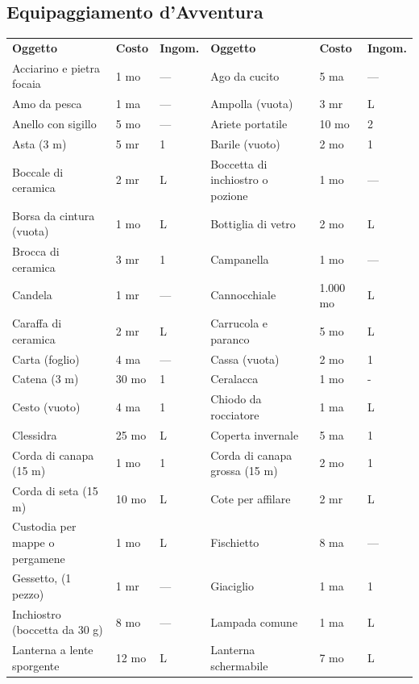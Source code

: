 \documentclass[a4paper,11pt,twoside,openany]{book}
\begin{document}
\subsection{Equipaggiamento d'Avventura}\label{Equipaggiamento}

\label{equipaggiamento-davventura}


\begin{tabularx}{1\textwidth}{XllXll}
	\textbf{Oggetto}    & \textbf{Costo} & \textbf{Ingom.} & \textbf{Oggetto}    & \textbf{Costo}  & \textbf{Ingom.} \\
	Acciarino e pietra focaia   & 1 mo& —   & Ago da cucito & 5 ma& —   \\
	Amo da pesca  & 1 ma& —   & Ampolla (vuota)& 3 mr& L   \\
	Anello con sigillo  & 5 mo& —   & Ariete portatile    & 10 mo& 2   \\
	Asta (3 m)    & 5 mr& 1   & Barile (vuoto)& 2 mo& 1   \\
	Boccale di ceramica & 2 mr& L   & Boccetta di inchiostro o pozione  & 1 mo& —   \\
	Borsa da cintura (vuota)    & 1 mo& L   & Bottiglia di vetro  & 2 mo& L   \\
	Brocca di ceramica  & 3 mr& 1   & Campanella    & 1 mo& —   \\
	Candela & 1 mr& —   & Cannocchiale  & 1.000 mo  & L   \\
	Caraffa di ceramica & 2 mr& L   & Carrucola e paranco & 5 mo& L   \\
	Carta (foglio)& 4 ma& —   & Cassa (vuota) & 2 mo& 1   \\
	Catena (3 m)  & 30 mo    & 1   & Ceralacca& 1 mo& -   \\
	Cesto (vuoto) & 4 ma& 1   & Chiodo da rocciatore& 1 ma& L   \\
	Clessidra& 25 mo    & L   & Coperta invernale   & 5 ma& 1   \\
	Corda di canapa (15 m)& 1 mo& 1   & Corda di canapa grossa (15 m)& 2 mo& 1   \\
	Corda di seta (15 m)& 10 mo    & L   & Cote per affilare   & 2 mr& L   \\
	Custodia per mappe o pergamene    & 1 mo& L   & Fischietto    & 8 ma& —   \\
	Gessetto, (1 pezzo) & 1 mr& —   & Giaciglio& 1 ma& 1   \\
	Inchiostro (boccetta da 30 g)& 8 mo& —   & Lampada comune& 1 ma& L   \\
	Lanterna a lente sporgente  & 12 mo    & L   & Lanterna schermabile& 7 mo& L   \\

\end{tabularx}
\end{document}
